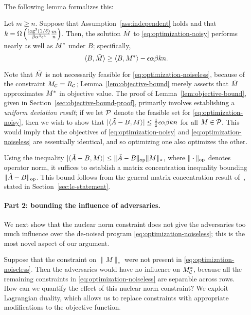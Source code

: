 The following lemma formalizes this:
\begin{lemma}
\label{lem:objective-bound}
Let $m \geq n$. Suppose that Assumption~\ref{ass:independent} holds and that 
$k = \Omega\left(  \frac{\log^3(1/\delta)}{\beta\alpha^3\epsilon^4}\frac{m}{n} \right)$. 
Then, the solution $\tilde{M}$ to \eqref{eq:optimization-noisy} performs nearly as 
well as $M^*$ under $B$; specifically,
\begin{equation}
\label{eq:objective-bound}
\langle B, \tilde{M} \rangle \geq \langle B, M^* \rangle - \epsilon \alpha\beta kn.
\end{equation}
\end{lemma}
Note that $\tilde{M}$ is not necessarily feasible for \eqref{eq:optimization-noiseless}, 
because of the constraint $M_{\mathcal{C}} = R_{\mathcal{C}}$; Lemma~\ref{lem:objective-bound} 
merely asserts that $\tilde{M}$ approximates $M^*$ in objective value. The proof of 
Lemma~\ref{lem:objective-bound}, given in Section~\ref{sec:objective-bound-proof}, 
primarily involves establishing a 
\emph{uniform deviation result}; if we let $\mathcal{P}$ denote the feasible set for 
\eqref{eq:optimization-noisy}, then we wish to show that 
$|\langle \tilde{A} - B, M \rangle| \leq \frac{1}{2}\epsilon \alpha\beta kn$ for all 
$M \in \mathcal{P}$. This would imply that the objectives of 
\eqref{eq:optimization-noisy} and \eqref{eq:optimization-noiseless} are 
essentially identical, and so optimizing one also optimizes the other.

Using the inequality $|\langle \tilde{A} - B, M \rangle| \leq \|\tilde{A}-B\|_{\mathrm{op}}\|M\|_*$, 
where $\|\cdot\|_{\mathrm{op}}$ denotes operator norm, it suffices to establish a matrix 
concentration inequality bounding $\|\tilde{A} - B\|_{\mathrm{op}}$.   
This bound follows from the general matrix concentration result of~\cite{le2015concentration},
stated in Section~\ref{sec:le-statement}.

\paragraph{Part 2: bounding the influence of adversaries.} 
We next show that the nuclear norm constraint does 
not give the adversaries too much influence over the de-noised program 
\eqref{eq:optimization-noiseless}; this is the most novel aspect 
of our argument.

Suppose that the constraint on $\|M\|_*$ were not present in 
\eqref{eq:optimization-noiseless}. Then the adversaries would have 
no influence on $M^*_{\mathcal{C}}$, because all the remaining constraints 
in \eqref{eq:optimization-noiseless} are separable across rows. 
How can we quantify the effect of this nuclear norm constraint?
We exploit Lagrangian duality, which allows us to replace constraints 
with appropriate modifications to the objective function.

